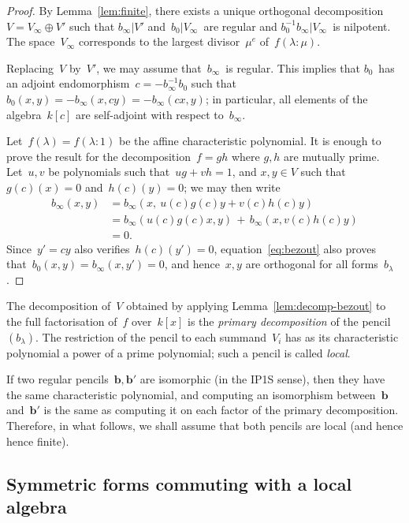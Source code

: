 \documentclass{article}%
\begin{document}
\begin{proof}
By Lemma~\ref{lem:finite}, there exists a unique orthogonal
decomposition~$V = V_{∞} ⊕ V'$ such that $b_{∞} | V'$ and~$b_{0} |
V_{∞}$~are regular and $b_{0}^{-1} b_{∞} | V_{∞}$~is nilpotent. The
space~$V_{∞}$ corresponds to the largest divisor~$μ^{e}$ of~$f(λ:μ)$.

Replacing~$V$ by~$V'$, we may assume that~$b_{∞}$~is regular. This
implies that $b_0$~has an adjoint endomorphism~$c = -b_{∞}^{-1} b_0$ such
that~$b_0(x,y) = -b_{∞}(x, c y) = -b_{∞}(c x, y)$; in particular, all
elements of the algebra~$k[c]$ are self-adjoint with respect to~$b_{∞}$.

Let~$f(λ) = f(λ: 1)$ be the affine characteristic polynomial. It is
enough to prove the result for the decomposition~$f = gh$ where $g, h$
are mutually prime. Let~$u, v$ be polynomials such that~$ug + vh = 1$, and
$x, y ∈ V$ such that~$g(c)(x) = 0$ and~$h(c)(y) = 0$; we may then write
\begin{equation}\label{eq:bezout}
\begin{split}
b_{∞} (x, y) & = b_{∞} (x,\: u(c) g(c) y + v(c) h(c) y ) \\
&= b_{∞} (u(c) g(c) x, y) \,+\, b_{∞} (x, v(c) h(c) y) \\
&= 0.
\end{split}
\end{equation}
Since~$y' = c y$ also verifies~$h(c)(y') = 0$, equation~\eqref{eq:bezout}
also proves that~$b_{0}(x,y) = b_{∞}(x,y') = 0$, and hence~$x, y$ are
orthogonal for all forms~$b_{λ}$.
\end{proof}%

The decomposition of~$V$ obtained by applying
Lemma~\ref{lem:decomp-bezout} to the full factorisation of~$f$
over~$k[x]$ is the \emph{primary decomposition} of the pencil~$(b_{λ})$.
The restriction of the pencil to each summand~$V_i$ has as its
characteristic polynomial a power of a prime polynomial; such a pencil is
called \emph{local}.

If two regular pencils~$\bm{b}, \bm{b}'$ are isomorphic (in the IP1S sense), then
they have the same characteristic polynomial, and computing an
isomorphism between~$\bm{b}$ and~$\bm{b}'$ is the same as computing it on each
factor of the primary decomposition. Therefore, in what follows, we shall
assume that both pencils are local (and hence hence finite).

\subsection{Symmetric forms commuting with a local algebra}%
\label{ss:commute}
\end{document}
